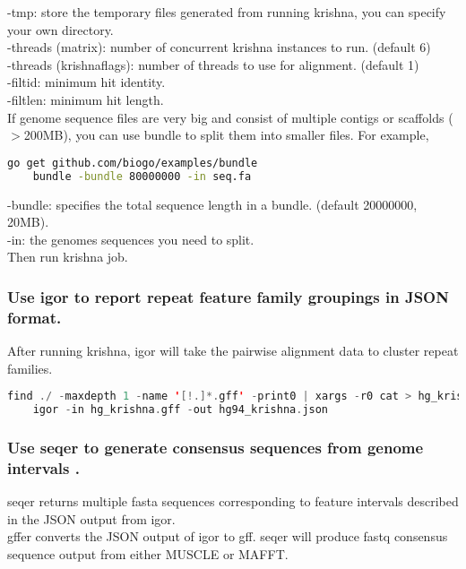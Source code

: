\documentclass[a4paper,12pt]{article}
\begin{document}
	\noindent -tmp: store the temporary files generated from running krishna, you can specify your own directory. \\
	-threads (matrix): number of concurrent krishna instances to run. (default 6) \\
	-threads (krishnaflags): number of threads to use for alignment. (default 1) \\
	-filtid: minimum hit identity. \\
	-filtlen: minimum hit length. \\
	
	\noindent If genome sequence files are very big and consist of multiple contigs or scaffolds ($>$200MB), you can use bundle to split them into smaller files. For example,
	
	\begin{lstlisting}[language=bash]
	go get github.com/biogo/examples/bundle
	bundle -bundle 80000000 -in seq.fa \end{lstlisting}
	
	\noindent -bundle: specifies the total sequence length in a bundle. (default 20000000, 20MB).\\
	-in: the genomes sequences you need to split.\\
	Then run krishna job.\\
	
	\subsubsection{Use igor to report repeat feature family groupings in JSON format.}
	
	After running krishna, igor will take the pairwise alignment data to cluster repeat families.
	\begin{lstlisting}[language=scala]
	find ./ -maxdepth 1 -name '[!.]*.gff' -print0 | xargs -r0 cat > hg_krishna.gff
	igor -in hg_krishna.gff -out hg94_krishna.json \end{lstlisting}
	
	\subsubsection{Use seqer to generate consensus sequences from genome intervals .}
	seqer returns multiple fasta sequences corresponding to feature intervals described in the JSON output from igor. \\
	
	\noindent gffer converts the JSON output of igor to gff. seqer will produce fastq consensus sequence output from either MUSCLE or MAFFT. 
	
\end{document}
